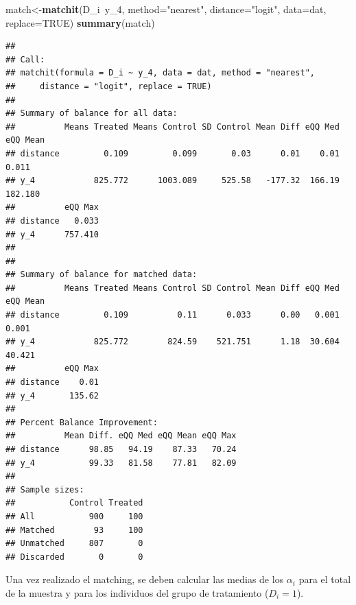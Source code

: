 \documentclass[]{article}
\newenvironment{Shaded}{\begin{snugshade}}{\end{snugshade}}
\newcommand{\KeywordTok}[1]{\textcolor[rgb]{0.13,0.29,0.53}{\textbf{{#1}}}}
\newcommand{\DataTypeTok}[1]{\textcolor[rgb]{0.13,0.29,0.53}{{#1}}}
\newcommand{\DecValTok}[1]{\textcolor[rgb]{0.00,0.00,0.81}{{#1}}}
\newcommand{\StringTok}[1]{\textcolor[rgb]{0.31,0.60,0.02}{{#1}}}
\newcommand{\CommentTok}[1]{\textcolor[rgb]{0.56,0.35,0.01}{\textit{{#1}}}}
\newcommand{\OtherTok}[1]{\textcolor[rgb]{0.56,0.35,0.01}{{#1}}}
\newcommand{\NormalTok}[1]{{#1}}
\begin{document}
\begin{Shaded}
\begin{Highlighting}[]
\NormalTok{match<-}\KeywordTok{matchit}\NormalTok{(D_i~y_4, }\DataTypeTok{method=}\StringTok{"nearest"}\NormalTok{, }\DataTypeTok{distance=}\StringTok{"logit"}\NormalTok{, }\DataTypeTok{data=}\NormalTok{dat, }\DataTypeTok{replace=}\OtherTok{TRUE}\NormalTok{)}
\KeywordTok{summary}\NormalTok{(match)}
\end{Highlighting}
\end{Shaded}

\begin{verbatim}
## 
## Call:
## matchit(formula = D_i ~ y_4, data = dat, method = "nearest", 
##     distance = "logit", replace = TRUE)
## 
## Summary of balance for all data:
##          Means Treated Means Control SD Control Mean Diff eQQ Med eQQ Mean
## distance         0.109         0.099       0.03      0.01    0.01    0.011
## y_4            825.772      1003.089     525.58   -177.32  166.19  182.180
##          eQQ Max
## distance   0.033
## y_4      757.410
## 
## 
## Summary of balance for matched data:
##          Means Treated Means Control SD Control Mean Diff eQQ Med eQQ Mean
## distance         0.109          0.11      0.033      0.00   0.001    0.001
## y_4            825.772        824.59    521.751      1.18  30.604   40.421
##          eQQ Max
## distance    0.01
## y_4       135.62
## 
## Percent Balance Improvement:
##          Mean Diff. eQQ Med eQQ Mean eQQ Max
## distance      98.85   94.19    87.33   70.24
## y_4           99.33   81.58    77.81   82.09
## 
## Sample sizes:
##           Control Treated
## All           900     100
## Matched        93     100
## Unmatched     807       0
## Discarded       0       0
\end{verbatim}

Una vez realizado el matching, se deben calcular las medias de los
$\alpha_{i}$ para el total de la muestra y para los individuos del grupo
de tratamiento ($D_{i}=1$).

\begin{Shaded}
\end{Shaded}
\end{document}
